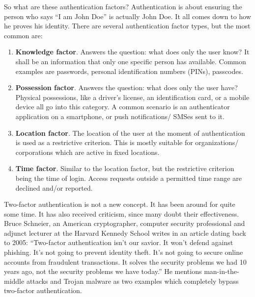 So what are these authentication factors?
Authentication is about ensuring the person who says ``I am John Doe'' is actually John Doe.
It all comes down to how he proves his identity.
There are several authentication factor types, but the most common are:
\begin{enumerate}
    \item \textbf{Knowledge factor}.
        Answers the question: what does only the user know?
        It shall be an information that only one specific person has available.
        Common examples are passwords, personal identification numbers (PINs), passcodes.
    
    \item \textbf{Possession factor}.
        Answers the question: what does only the user have?
        Physical possessions, like a driver's license, an identification card, or a mobile device all go into this category.
        A common scenario is an authenticator application on a smartphone, or push notifications/ SMSes sent to it. 
    
    \item \textbf{Location factor}.
        The location of the user at the moment of authentication is used as a restrictive criterion.
        This is mostly suitable for organizations/ corporations which are active in fixed locations.
    
    \item \textbf{Time factor}.
        Similar to the location factor, but the restrictive criterion being the time of login.
        Access requests outside a permitted time range are declined and/or reported.
\end{enumerate}

Two-factor authentication is not a new concept.
It has been around for quite some time.
It has also received criticism, since many doubt their effectiveness.
Bruce Schneier, an American cryptographer, computer security professional and adjunct lecturer at the Harvard Kennedy School writes in an article dating back to 2005:
``Two-factor authentication isn't our savior.
It won't defend against phishing.
It's not going to prevent identity theft.
It's not going to secure online accounts from fraudulent transactions.
It solves the security problems we had 10 years ago, not the security problems we have today.''\cite{2facriticism}
He mentions man-in-the-middle attacks and Trojan malware as two examples which completely bypass two-factor authentication. 

